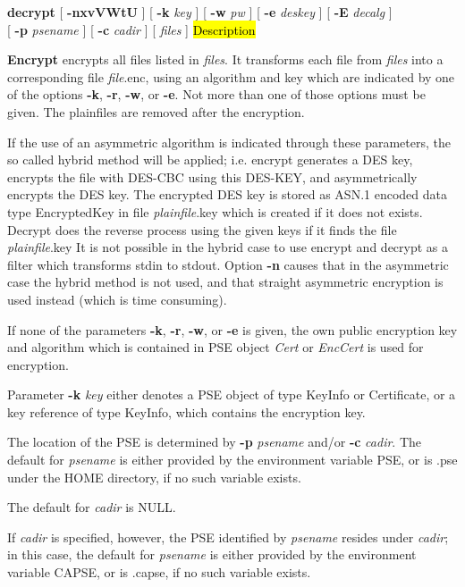 {\bf decrypt} [ {\bf -nxvVWtU} ] [ {\bf -k} {\em key} ] [ {\bf -w} {\em pw} ] [ {\bf -e} {\em deskey} ] [ {\bf -E} {\em decalg} ] \\
\hspace*{1.59cm} [ {\bf -p} {\em psename} ] [ {\bf -c} {\em cadir} ] [ {\em files} ]
\hl{Description}

{\large\bf Encrypt} encrypts all files listed in {\em files}. It transforms each
file from {\em files} into a corresponding file {\em file}.enc, using 
an algorithm and key which are indicated by one of the options 
{\bf -k}, {\bf -r}, {\bf -w}, or {\bf -e}. Not more than one of those options 
must be given.
The plainfiles are removed after the encryption.

If the use of an asymmetric algorithm is indicated through
these parameters, the so called hybrid method will be applied; i.e. encrypt
generates a DES key, encrypts the file with DES-CBC using this DES-KEY,
and asymmetrically encrypts the DES key. The encrypted DES key is stored as
ASN.1 encoded data type EncryptedKey
in file {\em plainfile}.key which is created if it does not exists. Decrypt
does the reverse process using the given keys if it finds the file {\em plainfile}.key
It is not possible in the hybrid case to use encrypt and decrypt as a filter
which transforms stdin to stdout. Option {\bf -n} causes that in the asymmetric case
the hybrid method is not used, and that straight asymmetric encryption is
used instead (which is time consuming).
 
If none of the parameters {\bf -k}, {\bf -r}, {\bf -w}, or {\bf -e} is given, the own public
encryption key and algorithm which is contained in PSE object {\em Cert} or {\em EncCert} is used
for encryption. 
 
Parameter {\bf -k} {\em key} either denotes a PSE object of type KeyInfo or Certificate, 
or a key reference of type KeyInfo, which contains the encryption key.

The location of the PSE is determined by {\bf -p} {\em psename} and/or {\bf -c} {\em cadir}. 
The default for {\em 
psename} is either provided by the environment variable PSE, or is .pse under the HOME directory, 
if no such variable exists.
 
The default for {\em cadir} is NULL. 

If {\em cadir} is specified,
however, the PSE identified by {\em psename} resides under {\em cadir}; in this case, the default
for {\em psename} is either provided by the environment variable CAPSE, or is .capse, if no such variable
exists. 
 
